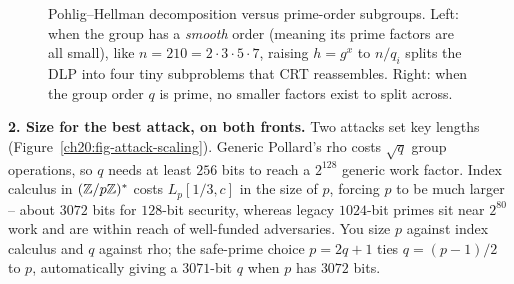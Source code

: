 \begin{figure}[htbp]
\caption{Pohlig--Hellman decomposition versus prime-order subgroups. Left: when the group has a \emph{smooth} order (meaning its prime factors are all small), like $n = 210 = 2 \cdot 3 \cdot 5 \cdot 7$, raising $h = g^x$ to $n/q_i$ splits the DLP into four tiny subproblems that CRT reassembles. Right: when the group order $q$ is prime, no smaller factors exist to split across.}
\label{ch20:fig-pohlig-hellman}
\end{figure}

\textbf{2. Size for the best attack, on both fronts.} Two attacks set key lengths (Figure~\ref{ch20:fig-attack-scaling}). Generic Pollard's rho
costs $\sqrt{q}$ group operations, so $q$ needs at least $256$ bits to reach a $2^{128}$ generic work factor.
Index calculus in $(\mathbb{Z}/p\mathbb{Z})^{*}$ costs $L_p[1/3, c]$ in the size of $p$, forcing $p$ to be much larger --
about $3072$ bits for $128$-bit security, whereas legacy $1024$-bit primes sit near $2^{80}$ work and are within reach of well-funded adversaries. You size $p$ against index calculus and $q$ against rho;
the safe-prime choice $p = 2q+1$ ties $q = (p-1)/2$ to $p$, automatically giving a $3071$-bit $q$ when $p$ has $3072$ bits.

